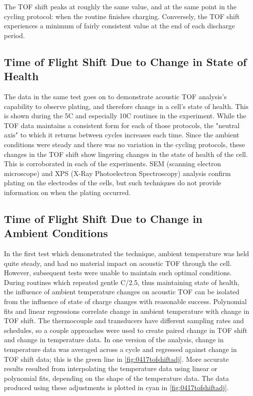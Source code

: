 The TOF shift peaks at roughly the same value, and at the same point in the cycling protocol: when the routine finishes charging. 
Conversely, the TOF shift experiences a minimum of fairly consistent value at the end of each discharge period.

\subsection{Time of Flight Shift Due to Change in State of Health}
The data in the same test goes on to demonstrate acoustic TOF analysis's capability to observe plating, and therefore change in a cell's state of health. This is shown during the 5C and especially 10C routines in the experiment. 
While the TOF data maintains a consistent form for each of those protocols, the "neutral axis" to which it returns between cycles increases each time. 
Since the ambient conditions were steady and there was no variation in the cycling protocols, these changes in the TOF shift show lingering changes in the state of health of the cell. 
This is corroborated in each of the experiments. 
SEM (scanning electron microscope) and XPS (X-Ray Photoelectron Spectroscopy) analysis confirm plating on the electrodes of the cells, but such techniques do not provide information on when the plating occurred. 


\subsection{Time of Flight Shift Due to Change in Ambient Conditions}
In the first test which demonstrated the technique, ambient temperature was held quite steady, and had no material impact on acoustic TOF through the cell. 
However, subsequent tests were unable to maintain such optimal conditions.
During routines which repeated gentle C/2.5, thus maintaining state of health, the influence of ambient temperature changes on acoustic TOF can be isolated from the influence of state of charge changes with reasonable success. 
Polynomial fits and linear regressions correlate change in ambient temperature with change in TOF shift. 
The thermocouple and transducers have different sampling rates and schedules, so a couple approaches were used to create paired change in TOF shift and change in temperature data. 
In one version of the analysis, change in temperature data was averaged across a cycle and regressed against change in TOF shift data; this is the green line in \hyperref[fig:0417tofshiftadj]{\cref{fig:0417tofshiftadj}}. 
More accurate results resulted from interpolating the temperature data using linear or polynomial fits, depending on the shape of the temperature data. The data produced using these adjustments is plotted in cyan in \hyperref[fig:0417tofshiftadj]{\cref{fig:0417tofshiftadj}}.

